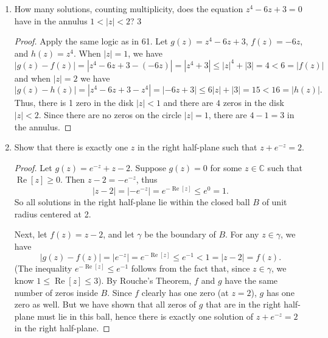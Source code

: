 \documentclass[10pt]{article}
\newcommand{\C}{\mathbb{C}}
\DeclareMathOperator*{\re}{Re}
\begin{document}
\begin{enumerate}
\begin{proof}
Let $g(z) = z^7 - 2z^5 + 6z^3 - z + 1$ and $f(z) = 6z^3$.  Also, let $\Gamma$ be the unit circle.  Since $\Gamma$ is simple and homologous to 0 in the open set $\C$, $f$ and $g$ are holomorphic, and for any $z \in \Gamma$ we have
$$
|g(z) - f(z)| = |z^7 - 2z^5 - z + 1| \leq |z|^7 + 2|z|^5 + |z| + |1| = 5 < 6 = |f(z)|,
$$
Rouche's Theorem implies that $f$ and $z$ have the same number of zeros inside $\Gamma$.  Since $f$ clearly has three, so does $g$.
\end{proof}

\item How many solutions, counting multiplicity, does the equation $z^4 - 6z + 3 = 0$ have in the annulus $1 < |z| < 2$? \hspace{1cm} $\boxed{3}$

\begin{proof}
Apply the same logic as in 61.  Let $g(z) = z^4 - 6z + 3$, $f(z) = -6z$, and $h(z) = z^4$.  When $|z| = 1$, we have
$$
|g(z) - f(z)| = |z^4 - 6z + 3 - (-6z)| = |z^4 + 3| \leq |z|^4 + |3| = 4 < 6 = |f(z)|
$$
and when $|z| = 2$ we have
$$
|g(z) - h(z)| = |z^4 - 6z + 3 - z^4| = |-6z + 3| \leq 6|z| + |3| = 15 < 16 = |h(z)|.
$$
Thus, there is 1 zero in the disk $|z| < 1$ and there are $4$ zeros in the disk $|z| < 2$.  Since there are no zeros on the circle $|z| = 1$, there are $4 - 1 = 3$ in the annulus.
\end{proof}

\item Show that there is exactly one $z$ in the right half-plane such that $z + e^{-z} = 2$.

\begin{proof}
Let $g(z) = e^{-z} + z - 2$.  Suppose $g(z) = 0$ for some $z \in \C$ such that $\re [ z ] \geq 0$.  Then $z-2 = -e^{-z}$, thus
$$
|z - 2| = |-e^{-z}| = e^{-\re[z]} \leq e^{0} = 1.
$$
So all solutions in the right half-plane lie within the closed ball $B$ of unit radius centered at 2.

Next, let $f(z) = z - 2$, and let $\gamma$ be the boundary of $B$.  For any $z \in \gamma$, we have
$$
|g(z) - f(z)| = |e^{-z}| = e^{-\re [z]} \leq e^{-1} < 1 = |z-2| = f(z).
$$
(The inequality $e^{-\re [z]} \leq e^{-1}$ follows from the fact that, since $z \in \gamma$, we know $1 \leq \re [ z ] \leq 3$).  By Rouche's Theorem, $f$ and $g$ have the same number of zeros inside $B$.  Since $f$ clearly has one zero (at $z = 2$), $g$ has one zero as well.  But we have shown that all zeros of $g$ that are in the right half-plane must lie in this ball, hence there is exactly one solution of $z + e^{-z} = 2$ in the right half-plane.
\end{proof}
\end{enumerate}
\end{document}
